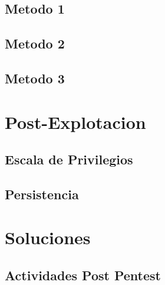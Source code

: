\documentclass[a4paper]{article}%
\begin{document}
	\subsection{Metodo 1}

	\subsection{Metodo 2}

	\subsection{Metodo 3}

	\section{Post-Explotacion}

	\subsection{Escala de Privilegios}

	\subsection{Persistencia}

	\section{Soluciones}
		
		\subsection{Actividades Post Pentest}

	
\end{document}
